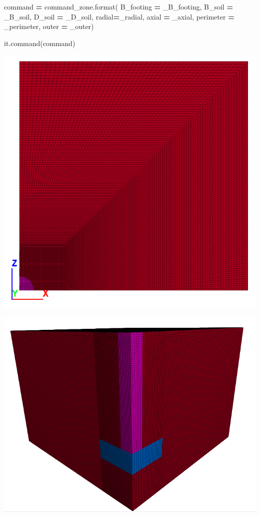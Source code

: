 \documentclass[a4paper, nobind]{templates/ociamthesis}
\newenvironment{Shaded}{\begin{snugshade}}{\end{snugshade}}
\newcommand{\BuiltInTok}[1]{#1}
\newcommand{\NormalTok}[1]{#1}
\newcommand{\OperatorTok}[1]{\textcolor[rgb]{0.81,0.36,0.00}{\textbf{#1}}}
\renewenvironment{Shaded}
{
  \vspace{10pt}%
  \begin{snugshade}%
}{%
  \end{snugshade}%
  \vspace{8pt}%
}
\begin{document}
\begin{Shaded}
\begin{Highlighting}[]
\NormalTok{command }\OperatorTok{=}\NormalTok{ command\_zone.}\BuiltInTok{format}\NormalTok{(}
\NormalTok{B\_footing }\OperatorTok{=}\NormalTok{ \_B\_footing,}
\NormalTok{B\_soil }\OperatorTok{=}\NormalTok{ \_B\_soil,}
\NormalTok{D\_soil }\OperatorTok{=}\NormalTok{ \_D\_soil,}
\NormalTok{radial}\OperatorTok{=}\NormalTok{\_radial,}
\NormalTok{axial }\OperatorTok{=}\NormalTok{ \_axial,}
\NormalTok{perimeter }\OperatorTok{=}\NormalTok{ \_perimeter,}
\NormalTok{outer }\OperatorTok{=}\NormalTok{ \_outer)}

\NormalTok{it.command(command)}
\end{Highlighting}
\end{Shaded}

\includegraphics[width=1\linewidth]{myfigureeeeee/e}

\includegraphics[width=1\linewidth]{myfigureeeeee/f}
\end{document}

